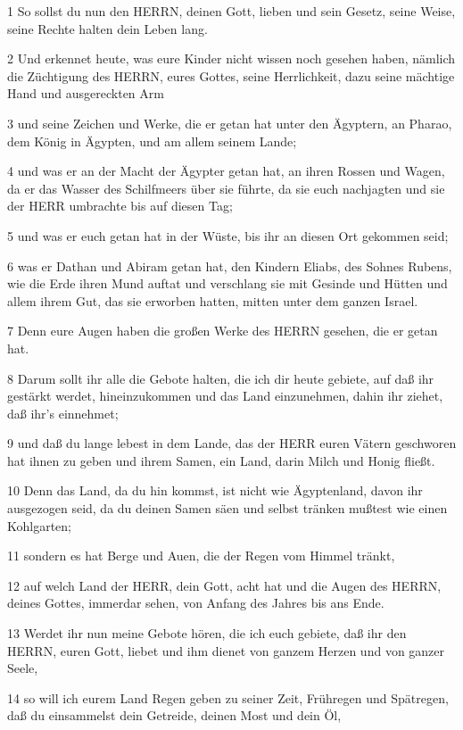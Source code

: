 \par 1 So sollst du nun den HERRN, deinen Gott, lieben und sein Gesetz, seine Weise, seine Rechte halten dein Leben lang.
\par 2 Und erkennet heute, was eure Kinder nicht wissen noch gesehen haben, nämlich die Züchtigung des HERRN, eures Gottes, seine Herrlichkeit, dazu seine mächtige Hand und ausgereckten Arm
\par 3 und seine Zeichen und Werke, die er getan hat unter den Ägyptern, an Pharao, dem König in Ägypten, und am allem seinem Lande;
\par 4 und was er an der Macht der Ägypter getan hat, an ihren Rossen und Wagen, da er das Wasser des Schilfmeers über sie führte, da sie euch nachjagten und sie der HERR umbrachte bis auf diesen Tag;
\par 5 und was er euch getan hat in der Wüste, bis ihr an diesen Ort gekommen seid;
\par 6 was er Dathan und Abiram getan hat, den Kindern Eliabs, des Sohnes Rubens, wie die Erde ihren Mund auftat und verschlang sie mit Gesinde und Hütten und allem ihrem Gut, das sie erworben hatten, mitten unter dem ganzen Israel.
\par 7 Denn eure Augen haben die großen Werke des HERRN gesehen, die er getan hat.
\par 8 Darum sollt ihr alle die Gebote halten, die ich dir heute gebiete, auf daß ihr gestärkt werdet, hineinzukommen und das Land einzunehmen, dahin ihr ziehet, daß ihr's einnehmet;
\par 9 und daß du lange lebest in dem Lande, das der HERR euren Vätern geschworen hat ihnen zu geben und ihrem Samen, ein Land, darin Milch und Honig fließt.
\par 10 Denn das Land, da du hin kommst, ist nicht wie Ägyptenland, davon ihr ausgezogen seid, da du deinen Samen säen und selbst tränken mußtest wie einen Kohlgarten;
\par 11 sondern es hat Berge und Auen, die der Regen vom Himmel tränkt,
\par 12 auf welch Land der HERR, dein Gott, acht hat und die Augen des HERRN, deines Gottes, immerdar sehen, von Anfang des Jahres bis ans Ende.
\par 13 Werdet ihr nun meine Gebote hören, die ich euch gebiete, daß ihr den HERRN, euren Gott, liebet und ihm dienet von ganzem Herzen und von ganzer Seele,
\par 14 so will ich eurem Land Regen geben zu seiner Zeit, Frühregen und Spätregen, daß du einsammelst dein Getreide, deinen Most und dein Öl,
